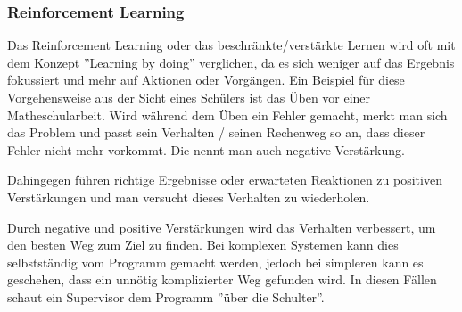 \subsubsection{Reinforcement Learning}

Das Reinforcement Learning oder das beschränkte/verstärkte Lernen wird oft mit dem Konzept ''Learning by doing'' verglichen, da es sich weniger auf das Ergebnis fokussiert und mehr auf Aktionen oder Vorgängen. Ein Beispiel für diese Vorgehensweise aus der Sicht eines Schülers ist das Üben vor einer Matheschularbeit. Wird während dem Üben ein Fehler gemacht, merkt man sich das Problem und passt sein Verhalten / seinen Rechenweg so an, dass dieser Fehler nicht mehr vorkommt. Die nennt man auch negative Verstärkung. 

Dahingegen führen richtige Ergebnisse oder erwarteten Reaktionen zu positiven Verstärkungen und man versucht dieses Verhalten zu wiederholen.

Durch negative und positive Verstärkungen wird das Verhalten verbessert, um den besten Weg zum Ziel zu finden. Bei komplexen Systemen kann dies selbstständig vom Programm gemacht werden, jedoch bei simpleren kann es geschehen, dass ein unnötig komplizierter Weg gefunden wird. In diesen Fällen schaut ein Supervisor dem Programm ''über die Schulter''.